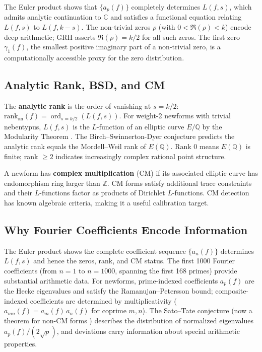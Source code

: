 \documentclass[11pt]{article}
\DeclareMathOperator{\ord}{ord}
\newcommand{\Z}{\mathbb{Z}}
\newcommand{\C}{\mathbb{C}}
\newcommand{\Q}{\mathbb{Q}}
\begin{document}
The Euler product shows that $\{a_p(f)\}$ completely determines $L(f,s)$, which admits analytic continuation to $\C$ and satisfies a functional equation relating $L(f,s)$ to $L(f, k - s)$. The non-trivial zeros $\rho$ (with $0 < \Re(\rho) < k$) encode deep arithmetic; GRH asserts $\Re(\rho) = k/2$ for all such zeros. The first zero $\gamma_1(f)$, the smallest positive imaginary part of a non-trivial zero, is a computationally accessible proxy for the zero distribution.

\subsection{Analytic Rank, BSD, and CM}

The \textbf{analytic rank} is the order of vanishing at $s = k/2$: $\mathrm{rank}_{\mathrm{an}}(f) = \ord_{s=k/2}(L(f,s))$. For weight-2 newforms with trivial nebentypus, $L(f,s)$ is the $L$-function of an elliptic curve $E/\Q$ by the Modularity Theorem \citep{breuil2001, wiles1995}. The Birch--Swinnerton-Dyer conjecture \citep{bsd1965} predicts the analytic rank equals the Mordell--Weil rank of $E(\Q)$. Rank 0 means $E(\Q)$ is finite; rank $\geq 2$ indicates increasingly complex rational point structure.

A newform has \textbf{complex multiplication} (CM) if its associated elliptic curve has endomorphism ring larger than $\Z$. CM forms satisfy additional trace constraints and their $L$-functions factor as products of Dirichlet $L$-functions. CM detection has known algebraic criteria, making it a useful calibration target.

\subsection{Why Fourier Coefficients Encode Information}

The Euler product shows the complete coefficient sequence $\{a_n(f)\}$ determines $L(f,s)$ and hence the zeros, rank, and CM status. The first 1000 Fourier coefficients (from $n=1$ to $n=1000$, spanning the first 168 primes) provide substantial arithmetic data. For newforms, prime-indexed coefficients $a_p(f)$ are the Hecke eigenvalues and satisfy the Ramanujan--Petersson bound; composite-indexed coefficients are determined by multiplicativity ($a_{mn}(f) = a_m(f)\,a_n(f)$ for coprime $m,n$). The Sato--Tate conjecture (now a theorem for non-CM forms \citep{sato-tate2011}) describes the distribution of normalized eigenvalues $a_p(f)/(2\sqrt{p})$, and deviations carry information about special arithmetic properties.
\end{document}
